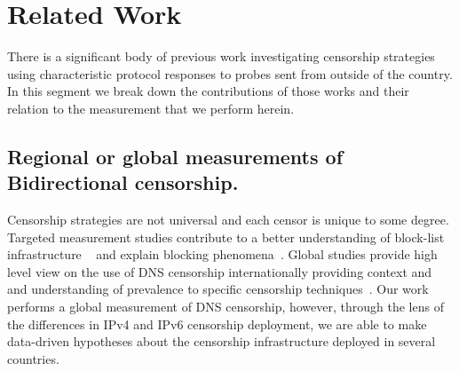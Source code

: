 \section{Related Work}\label{sec:related}

There is a significant body of previous work investigating censorship
strategies using characteristic protocol responses to probes sent from outside
of the country. In this segment we break down the contributions of those works
and their relation to the measurement that we perform herein.

\subsection{Regional or global measurements of Bidirectional censorship.}

Censorship strategies are not universal and each censor is unique to some
degree. Targeted measurement studies contribute to a better understanding of
block-list infrastructure ~\cite{ramesh2020decentralized, USESEC21:GFWatch} and
explain blocking phenomena~\cite{global2002great,
Anonymous2020:TripletCensors}. Global studies provide high level view on the
use of DNS censorship internationally providing context and and understanding
of prevalence to specific censorship techniques~\cite{vandersloot2018quack,
scott2016satellite, pearce2017global, sundara2020censored, niaki2020iclab}.
Our work performs a global measurement of DNS censorship, however, through the
lens of the differences in IPv4 and IPv6 censorship deployment, we are able to
make data-driven hypotheses about the censorship infrastructure deployed in
several countries.




